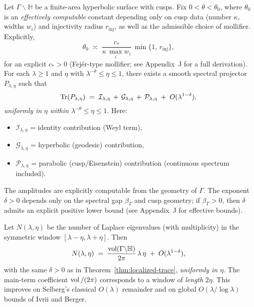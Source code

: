 \begin{theorem}\label{thm:localized-trace}
Let $\Gamma\backslash\mathbb{H}$ be a finite-area hyperbolic surface with cusps.
Fix $0<\theta<\theta_0$, where $\theta_0$ is an \emph{effectively computable} constant
depending only on cusp data (number $\kappa$, widths $w_i$) and injectivity
radius $r_{\mathrm{inj}}$, as well as the admissible choice of mollifier. Explicitly,
\[
   \theta_0 \;\asymp\; \frac{c_\ast}{\kappa \,\max_i w_i}\,
   \min\{1,\,r_{\mathrm{inj}}\},
\]
for an explicit $c_\ast>0$ (Fejér-type mollifier; see Appendix~J for a full derivation).
For each $\lambda\ge1$ and $\eta$ with $\lambda^{-\theta}\le\eta\le1$, there
exists a smooth spectral projector $P_{\lambda,\eta}$ such that
\[
   \operatorname{Tr}(P_{\lambda,\eta})
   \;=\; \mathcal{I}_{\lambda,\eta} \,+\,
          \mathcal{G}_{\lambda,\eta} \,+\,
          \mathcal{P}_{\lambda,\eta}
          \;+\; O(\lambda^{1-\delta}),
\]
\emph{uniformly in $\eta$ within $\lambda^{-\theta}\le\eta\le1$}. Here:
\begin{itemize}
  \item $\mathcal{I}_{\lambda,\eta}$ = identity contribution (Weyl term),
  \item $\mathcal{G}_{\lambda,\eta}$ = hyperbolic (geodesic) contribution,
  \item $\mathcal{P}_{\lambda,\eta}$ = parabolic (cusp/Eisenstein) contribution (continuous spectrum included).
\end{itemize}
The amplitudes are explicitly computable from the geometry of $\Gamma$. The
exponent $\delta>0$ depends only on the spectral gap $\beta_\Gamma$ and cusp
geometry; if $\beta_\Gamma>0$, then $\delta$ admits an explicit positive lower
bound (see Appendix~J for effective bounds).
\end{theorem}

\begin{theorem}\label{thm:local-weyl}
Let $N(\lambda,\eta)$ be the number of Laplace eigenvalues (with multiplicity)
in the symmetric window $[\lambda-\eta,\lambda+\eta]$. Then
\[
   N(\lambda,\eta)
   \;=\; \frac{\operatorname{vol}(\Gamma\backslash\mathbb{H})}{2\pi}\,\lambda\,\eta
   \;+\; O(\lambda^{1-\delta}),
\]
with the same $\delta>0$ as in Theorem~\ref{thm:localized-trace}, \emph{uniformly in $\eta$}.
The main-term coefficient $\operatorname{vol}/(2\pi)$ corresponds to a window of \emph{length} $2\eta$.
This improves on Selberg’s classical $O(\lambda)$ remainder and on global
$O(\lambda/\log\lambda)$ bounds of Ivrii and Berger.
\end{theorem}

